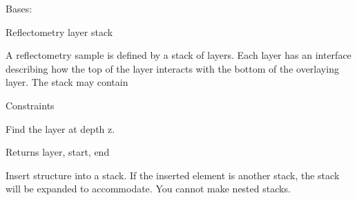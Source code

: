 \documentclass[letterpaper,10pt,english]{sphinxmanual}
\begin{document}
\begin{fulllineitems}
\label{api/model:refl1d.model.Stack}
Bases: {\hyperref[api/model:refl1d.model.Layer]{}}

Reflectometry layer stack

A reflectometry sample is defined by a stack of layers. Each layer
has an interface describing how the top of the layer interacts with
the bottom of the overlaying layer. The stack may contain

\begin{fulllineitems}
\label{api/model:refl1d.model.Stack.add}
\end{fulllineitems}


\begin{fulllineitems}
\label{api/model:refl1d.model.Stack.constraints}
Constraints

\end{fulllineitems}


\begin{fulllineitems}
\label{api/model:refl1d.model.Stack.find}
Find the layer at depth z.

Returns layer, start, end

\end{fulllineitems}


\begin{fulllineitems}
\label{api/model:refl1d.model.Stack.insert}
Insert structure into a stack.  If the inserted element is
another stack, the stack will be expanded to accommodate.  You
cannot make nested stacks.

\end{fulllineitems}


\begin{fulllineitems}
\label{api/model:refl1d.model.Stack.magnetic}
\end{fulllineitems}


\end{fulllineitems}
\end{document}
